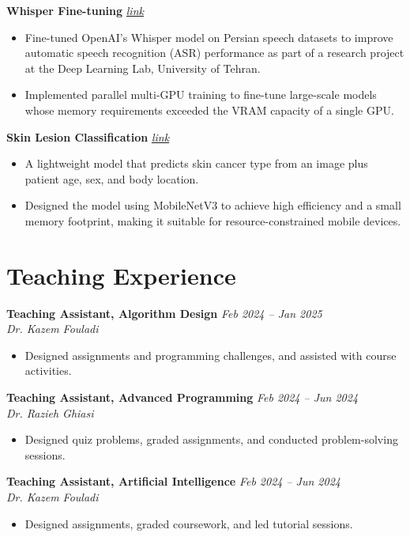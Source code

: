 \documentclass[10.5pt, letterpaper]{article}
\newcommand{\cvEntrySimple}[2]{
  \noindent\textbf{#1} \hfill \textit{#2}\\
}
\begin{document}
\textbf{Whisper Fine-tuning} \href{https://github.com/0ahmadi/persian_speech_to_text}{\textit{link}}
\begin{itemize}
    \item Fine-tuned OpenAI's Whisper model on Persian speech datasets to improve automatic speech recognition (ASR) performance as part of a research project at the Deep Learning Lab, University of Tehran.
    \item Implemented parallel multi-GPU training to fine-tune large-scale models whose memory requirements exceeded the VRAM capacity of a single GPU.
\end{itemize}

\textbf{Skin Lesion Classification} \href{https://github.com/0ahmadi/dermis}{\textit{link}}
\begin{itemize}
    \item A lightweight model that predicts skin cancer type from an image plus patient age, sex, and body location.
    \item Designed the model using MobileNetV3 to achieve high efficiency and a small memory footprint, making it suitable for resource-constrained mobile devices.
\end{itemize}


\section{Teaching Experience}

\cvEntrySimple{Teaching Assistant, Algorithm Design}{Feb 2024 – Jan 2025}
\textit{Dr. Kazem Fouladi}
\begin{itemize}
    \item Designed assignments and programming challenges, and assisted with course activities.
\end{itemize}

\cvEntrySimple{Teaching Assistant, Advanced Programming}{Feb 2024 – Jun 2024}
\textit{Dr. Razieh Ghiasi}
\begin{itemize}
    \item Designed quiz problems, graded assignments, and conducted problem-solving sessions.
\end{itemize}

\cvEntrySimple{Teaching Assistant, Artificial Intelligence}{Feb 2024 – Jun 2024}
\textit{Dr. Kazem Fouladi}
\begin{itemize}
    \item Designed assignments, graded coursework, and led tutorial sessions.
\end{itemize}
\end{document}
